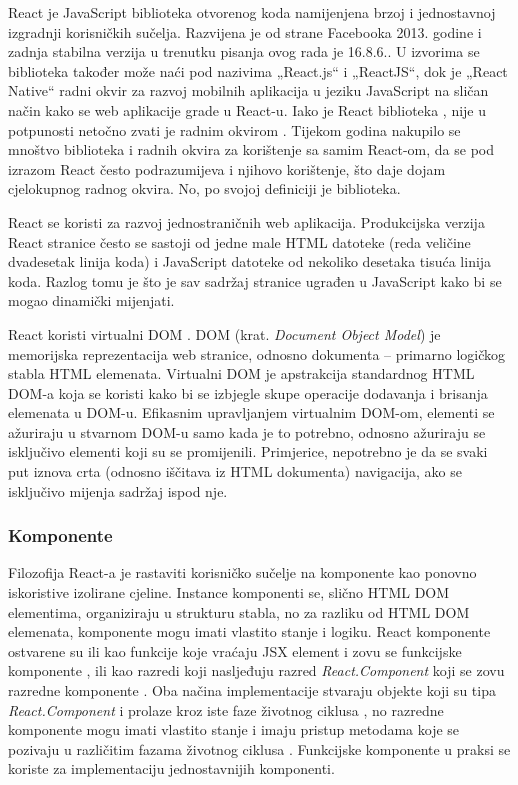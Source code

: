 \documentclass[times, utf8, diplomski, numeric]{fer}
\newcommand{\razmakp}{\vspace{18pt}}
\begin{document}
React je JavaScript biblioteka otvorenog koda namijenjena brzoj i jednostavnoj izgradnji korisničkih sučelja.
Razvijena je od strane Facebooka 2013. godine i zadnja stabilna verzija u trenutku pisanja ovog rada je 16.8.6.\citep{gh_react_changelog}.
U izvorima se biblioteka također može naći pod nazivima „React.js“ i „ReactJS“, dok je „React Native“ radni okvir za razvoj mobilnih aplikacija u jeziku JavaScript na sličan način kako se web aplikacije grade u React-u\citep{wiki_react}.
Iako je React biblioteka , nije u potpunosti netočno zvati je radnim okvirom .
Tijekom godina nakupilo se mnoštvo biblioteka i radnih okvira za korištenje sa samim React-om, da se pod izrazom React često podrazumijeva i njihovo korištenje, što daje dojam cjelokupnog radnog okvira. No, po svojoj definiciji je biblioteka.

React se koristi za razvoj jednostraničnih  web aplikacija.
Produkcijska verzija React stranice često se sastoji od jedne male HTML datoteke (reda veličine dvadesetak linija koda) i JavaScript datoteke od nekoliko desetaka tisuća linija koda.
Razlog tomu je što je sav sadržaj stranice ugrađen u JavaScript kako bi se mogao dinamički mijenjati.

\razmakp

React koristi virtualni DOM .
DOM (krat. \emph{Document Object Model}) je memorijska reprezentacija web stranice, odnosno dokumenta – primarno logičkog stabla HTML elemenata\citep{mdn_dom}.
Virtualni DOM je apstrakcija standardnog HTML DOM-a koja se koristi kako bi se izbjegle skupe operacije dodavanja i brisanja elemenata u DOM-u.
Efikasnim upravljanjem virtualnim DOM-om, elementi se ažuriraju u stvarnom DOM-u samo kada je to potrebno, odnosno ažuriraju se isključivo elementi koji su se promijenili\citep{med_vdom}.
Primjerice, nepotrebno je da se svaki put iznova crta (odnosno iščitava iz HTML dokumenta) navigacija, ako se isključivo mijenja sadržaj ispod nje.

\razmakp
\subsubsection{Komponente}

Filozofija React-a je rastaviti korisničko sučelje na komponente kao ponovno iskoristive izolirane cjeline.
Instance komponenti se, slično HTML DOM elementima, organiziraju u strukturu stabla, no za razliku od HTML DOM elemenata, komponente mogu imati vlastito stanje i logiku. React komponente ostvarene su ili kao funkcije koje vraćaju JSX element i zovu se funkcijske komponente , ili kao razredi koji nasljeđuju razred \emph{React.Component} koji se zovu razredne komponente .
Oba načina implementacije stvaraju objekte koji su tipa \emph{React.Component} i prolaze kroz iste faze životnog ciklusa , no razredne komponente mogu imati vlastito stanje i imaju pristup metodama koje se pozivaju u različitim fazama životnog ciklusa \citep{react_docs}.
Funkcijske komponente u praksi se koriste za implementaciju jednostavnijih komponenti.
\end{document}
